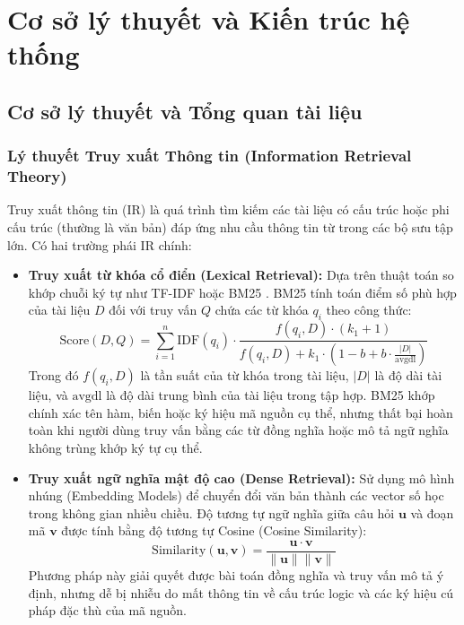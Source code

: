\documentclass[12pt,a4paper,oneside]{report}
\begin{document}
\newpage

\chapter{Cơ sở lý thuyết và Kiến trúc hệ thống}

\section{Cơ sở lý thuyết và Tổng quan tài liệu}

\subsection{Lý thuyết Truy xuất Thông tin (Information Retrieval Theory)}
Truy xuất thông tin (IR) là quá trình tìm kiếm các tài liệu có cấu trúc hoặc phi cấu trúc (thường là văn bản) đáp ứng nhu cầu thông tin từ trong các bộ sưu tập lớn. Có hai trường phái IR chính:
\begin{itemize}
    \item \textbf{Truy xuất từ khóa cổ điển (Lexical Retrieval):} Dựa trên thuật toán so khớp chuỗi ký tự như TF-IDF hoặc BM25 \cite{bm25}. BM25 tính toán điểm số phù hợp của tài liệu $D$ đối với truy vấn $Q$ chứa các từ khóa $q_i$ theo công thức:
    \begin{equation}
        \text{Score}(D, Q) = \sum_{i=1}^{n} \text{IDF}(q_i) \cdot \frac{f(q_i, D) \cdot (k_1 + 1)}{f(q_i, D) + k_1 \cdot \left(1 - b + b \cdot \frac{|D|}{\text{avgdl}}\right)}
    \end{equation}
    Trong đó $f(q_i, D)$ là tần suất của từ khóa trong tài liệu, $|D|$ là độ dài tài liệu, và $\text{avgdl}$ là độ dài trung bình của tài liệu trong tập hợp. BM25 khớp chính xác tên hàm, biến hoặc ký hiệu mã nguồn cụ thể, nhưng thất bại hoàn toàn khi người dùng truy vấn bằng các từ đồng nghĩa hoặc mô tả ngữ nghĩa không trùng khớp ký tự cụ thể.
    
    \item \textbf{Truy xuất ngữ nghĩa mật độ cao (Dense Retrieval):} Sử dụng mô hình nhúng (Embedding Models) để chuyển đổi văn bản thành các vector số học trong không gian nhiều chiều. Độ tương tự ngữ nghĩa giữa câu hỏi $\mathbf{u}$ và đoạn mã $\mathbf{v}$ được tính bằng độ tương tự Cosine (Cosine Similarity):
    \begin{equation}
        \text{Similarity}(\mathbf{u}, \mathbf{v}) = \frac{\mathbf{u} \cdot \mathbf{v}}{\|\mathbf{u}\| \|\mathbf{v}\|}
    \end{equation}
    Phương pháp này giải quyết được bài toán đồng nghĩa và truy vấn mô tả ý định, nhưng dễ bị nhiễu do mất thông tin về cấu trúc logic và các ký hiệu cú pháp đặc thù của mã nguồn.
\end{itemize}
\end{document}
